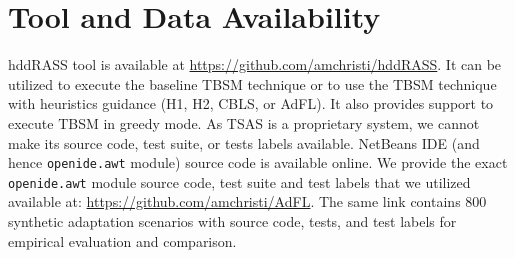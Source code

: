 \section{Tool and Data Availability}
hddRASS tool is available at \url{https://github.com/amchristi/hddRASS}. It can be utilized to execute the baseline TBSM technique or to use the TBSM technique with heuristics guidance (H1, H2, CBLS, or AdFL). It also provides support to execute TBSM in greedy mode. As TSAS is a proprietary system, we cannot make its source code, test suite, or tests labels available. NetBeans IDE (and hence \texttt{openide.awt} module) source code is available online. We  provide the exact \texttt{openide.awt} module source code, test suite and test labels that we utilized available at: \url{https://github.com/amchristi/AdFL}. The same link contains 800 synthetic adaptation scenarios with source code, tests, and test labels for empirical evaluation and comparison. 


